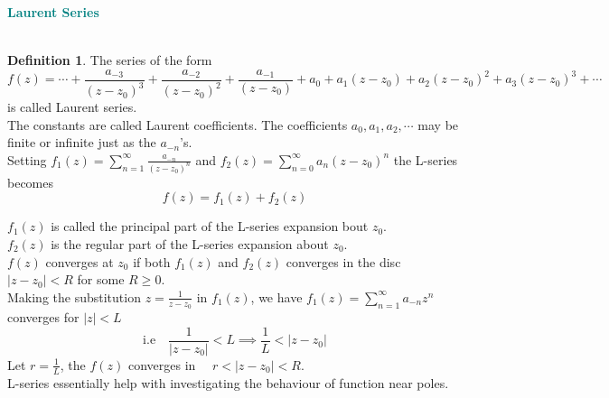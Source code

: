 \documentclass[11pt,a4paper]{article}
\theoremstyle{definition}
\newtheorem{definition}[thm]{Definition}
\begin{document}
\textbf{\textcolor{teal}{Laurent Series}}\\\\
\begin{definition}
The series of the form
$$f(z) = \cdots + \frac{a_{-3}}{(z -z _0)^3} + \frac{a_{-2}}{(z - z_0)^2} + \frac{a_{-1}}{(z - z_0)} + a_0 + a_1 (z - z_0) + a_2 (z - z_0)^2 + a_3 (z -z_0)^3 + \cdots$$ is called Laurent series.\\


The constants are called Laurent coefficients. The coefficients $a_0 , a_1, a_2, \cdots$  may be finite or infinite just as the $a_{-n}$'s.\\
Setting $\displaystyle{f_1(z) = \sum^{\infty}_{n = 1} \frac{a_{-n}}{(z - z_0)^n}}$ and $\displaystyle{f_2(z) = \sum^{\infty}_{n = 0}a_n ( z - z_0)^n}$ the L-series becomes $$f(z) = f_1(z)  + f_2(z)$$

$f_1(z)$ is called the principal part of the L-series expansion bout $z_0$.\\

$f_2(z)$ is the regular part of the L-series expansion about $z_0$.\\

$f(z)$ converges at $z_0$ if both $f_1(z)$ and $f_2(z)$ converges in the disc $\left|z - z_0\right| < R$ for some $R\geq 0$.\\

Making the substitution $z = \frac{1}{z - z_0}$ in $f_1(z)$, we have $\displaystyle{f_1(z) = \sum^{\infty}_{n = 1} a_{-n} z^n}$ converges for $\left|z\right| < L$
$$\text{i.e}\quad \frac{1}{\left|z - z_0\right|} < L \implies \frac{1}{L} < \left|z - z_0\right|$$
Let $r = \frac{1}{L}$, the $f(z)$ converges in $\quad  r < \left|z - z_0\right|< R$.\\

L-series essentially help with investigating the behaviour of function near poles.
\end{definition}
\end{document}

